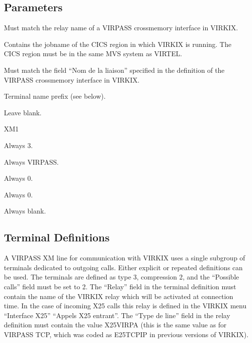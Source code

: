 \documentclass[letterpaper,10pt,english]{sphinxmanual}
\begin{document}
\subsection{Parameters}
\label{\detokenize{connectivity_guide:index-49}}\label{\detokenize{connectivity_guide:id20}}\begin{description}
\sphinxAtStartPar
Must match the relay name of a VIRPASS cross\sphinxhyphen{}memory interface in VIRKIX.

\sphinxAtStartPar
Contains the jobname of the CICS region in which VIRKIX is running.
The CICS region must be in the same MVS system as VIRTEL.

\sphinxAtStartPar
Must match the field “Nom de la liaison” specified in the definition
of the VIRPASS cross\sphinxhyphen{}memory interface in VIRKIX.

\sphinxAtStartPar
Terminal name prefix (see below).

\sphinxAtStartPar
Leave blank.

\sphinxAtStartPar
XM1

\sphinxAtStartPar
Always 3.

\sphinxAtStartPar
Always VIRPASS.

\sphinxAtStartPar
Always 0.

\sphinxAtStartPar
Always 0.

\sphinxAtStartPar
Always blank.

\end{description}

\ignorespaces 

\subsection{Terminal Definitions}
\label{\detokenize{connectivity_guide:index-50}}\label{\detokenize{connectivity_guide:id21}}
\sphinxAtStartPar
A VIRPASS XM line for communication with VIRKIX uses a single sub\sphinxhyphen{}group of terminals dedicated to outgoing calls. Either explicit or repeated definitions can be used. The terminals are defined as type 3, compression 2, and the “Possible calls” field must be set to 2. The “Relay” field in the terminal definition must contain the name of the VIRKIX relay which will be activated at connection time. In the case of incoming X25 calls this relay is defined in the VIRKIX menu “Interface X25” \textendash{} “Appels X25 entrant”. The “Type de line” field in the relay definition must contain the value X25VIRPA (this is the same value as for VIRPASS TCP, which was coded as E25TCPIP in previous versions of VIRKIX).
\end{document}
